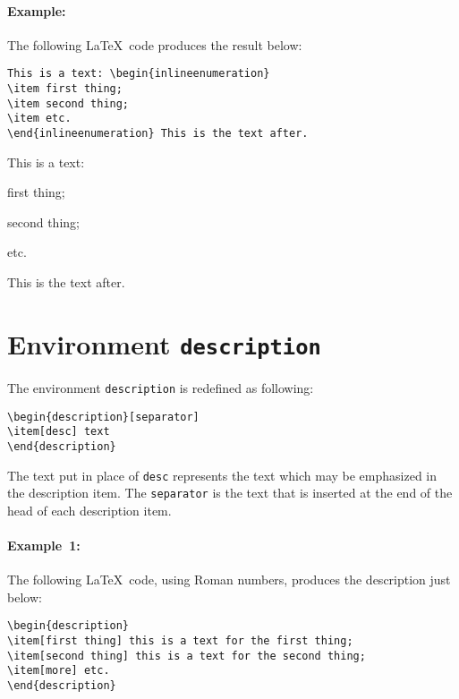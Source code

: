 \documentclass[book,taskpackage,specpackage,codepackage]{upmethodology-document}
\begin{document}
\paragraph{Example:} The following \LaTeX~code produces the result below:
\begin{verbatim}
This is a text: \begin{inlineenumeration}
\item first thing;
\item second thing;
\item etc.
\end{inlineenumeration} This is the text after.
\end{verbatim}

This is a text: \begin{inlineenumeration}
\item first thing;
\item second thing;
\item etc.
\end{inlineenumeration} This is the text after.

\section{Environment \texttt{description}}

The environment \texttt{description} is redefined as following:
\begin{verbatim}
\begin{description}[separator]
\item[desc] text
\end{description}
\end{verbatim}
The text put in place of \texttt{desc} represents the text which may be emphasized in the description item.
The \texttt{separator} is the text that is inserted at the end of the head of each description item.


\paragraph{Example~1:} The following \LaTeX~code, using Roman numbers, produces the description just below:
\begin{verbatim}
\begin{description}
\item[first thing] this is a text for the first thing;
\item[second thing] this is a text for the second thing;
\item[more] etc.
\end{description}
\end{verbatim}
\end{document}
